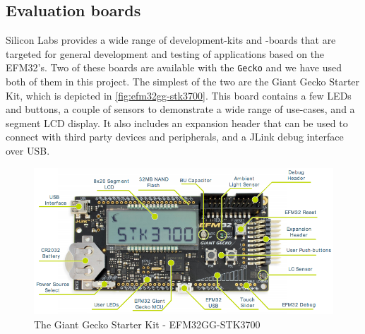 
\subsection{Evaluation boards}

Silicon Labs provides a wide range of development-kits and -boards that are targeted for general development and testing of applications based on the EFM32's.
Two of these boards are available with the \texttt{Gecko} and we have used both of them in this project.
The simplest of the two are the Giant Gecko Starter Kit, which is depicted in \autoref{fig:efm32gg-stk3700}.
This board contains a few LEDs and buttons, a couple of sensors to demonstrate a wide range of use-cases, and a segment LCD display.
It also includes an expansion header that can be used to connect with third party devices and peripherals, and a JLink debug interface over USB.

\begin{figure}[H]
  \begin{center}
    \includegraphics[scale=0.4]{figures/efm32gg-stk3700}
  \end{center}
  \caption{The Giant Gecko Starter Kit - EFM32GG-STK3700 \cite{UM-STK} }
  \label{fig:efm32gg-stk3700}
\end{figure}

